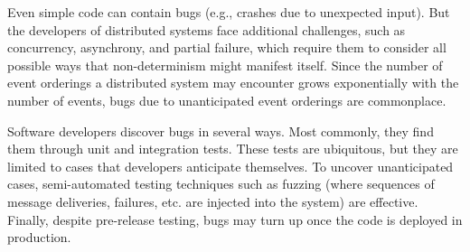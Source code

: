 
Even simple code can contain bugs (e.g., crashes due to unexpected input). But the developers
of distributed systems face
additional challenges, such as concurrency, asynchrony, and partial failure, which require them to
consider all possible ways that non-determinism might manifest itself. Since
the number of event orderings %
a distributed system may encounter grows exponentially with the number of
events, bugs due to unanticipated event orderings are commonplace.


% 

Software developers discover bugs in several ways.
Most commonly, they find them through unit and integration tests. These tests are ubiquitous, but they are limited to cases that developers
anticipate themselves. To uncover unanticipated cases, semi-automated testing techniques such as fuzzing (where
sequences of message deliveries, failures, etc. are injected into the system) are effective.
Finally, despite pre-release testing, bugs may turn up once the code is deployed in production.

